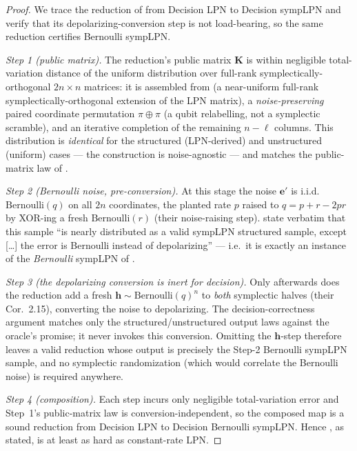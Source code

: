 \documentclass[11pt,a4paper]{article}
\theoremstyle{plain}
\theoremstyle{definition}
\begin{document}
\begin{proof}
We trace the reduction of \cite[Thm.~6.4]{KLP+25} from Decision LPN to Decision sympLPN and verify that its depolarizing-conversion step is not load-bearing, so the same reduction certifies Bernoulli sympLPN.

\emph{Step 1 (public matrix).} The reduction's public matrix $\mathbf K$ is within negligible total-variation distance of the uniform distribution over full-rank symplectically-orthogonal $2n\times n$ matrices: it is assembled from \cite[Lem.~6.2]{KLP+25} (a near-uniform full-rank symplectically-orthogonal extension of the LPN matrix), a \emph{noise-preserving} paired coordinate permutation $\pi\oplus\pi$ (a qubit relabelling, not a symplectic scramble), and an iterative completion of the remaining $n-\ell$ columns. This distribution is \emph{identical} for the structured (LPN-derived) and unstructured (uniform) cases --- the construction is noise-agnostic --- and matches the public-matrix law of .

\emph{Step 2 (Bernoulli noise, pre-conversion).} At this stage the noise $\mathbf e'$ is i.i.d.\ $\mathrm{Bernoulli}(q)$ on all $2n$ coordinates, the planted rate $p$ raised to $q=p+r-2pr$ by XOR-ing a fresh $\mathrm{Bernoulli}(r)$ (their noise-raising step). \cite{KLP+25} state verbatim that this sample ``is nearly distributed as a valid sympLPN structured sample, except [\dots] the error is Bernoulli instead of depolarizing'' --- i.e.\ it is exactly an instance of the \emph{Bernoulli} sympLPN of .

\emph{Step 3 (the depolarizing conversion is inert for decision).} Only afterwards does the reduction add a fresh $\mathbf h\sim\mathrm{Bernoulli}(q)^n$ to \emph{both} symplectic halves (their Cor.~2.15), converting the noise to depolarizing. The decision-correctness argument matches only the structured/unstructured output laws against the oracle's promise; it never invokes this conversion. Omitting the $\mathbf h$-step therefore leaves a valid reduction whose output is precisely the Step-2 Bernoulli sympLPN sample, and no symplectic randomization (which would correlate the Bernoulli noise) is required anywhere.

\emph{Step 4 (composition).} Each step incurs only negligible total-variation error and Step~1's public-matrix law is conversion-independent, so the composed map is a sound reduction from Decision LPN to Decision Bernoulli sympLPN. Hence , as stated, is at least as hard as constant-rate LPN.
\end{proof}
\end{document}
